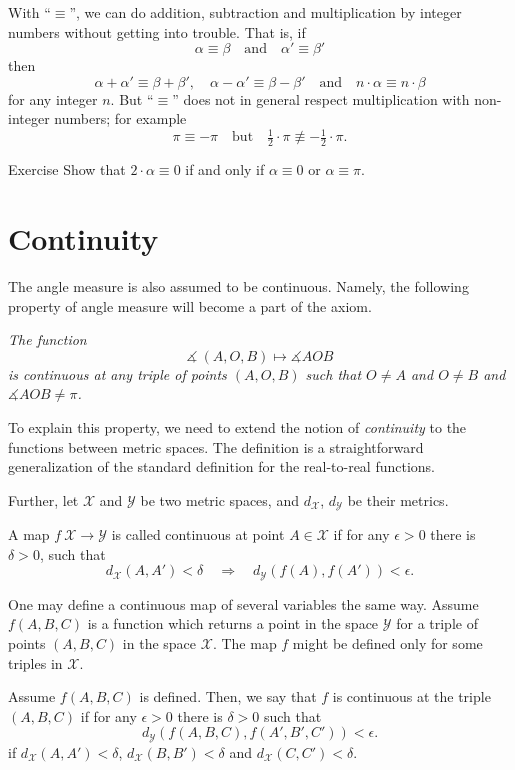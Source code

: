 With ``$\equiv$'', we can do addition, subtraction and multiplication by integer numbers without getting into trouble.
That is, if
$$\alpha\equiv\beta
\quad
\text{and}
\quad
\alpha'\equiv \beta'$$ 
then
$$\alpha+\alpha'\equiv\beta+\beta',
\quad
\alpha-\alpha'\equiv \beta-\beta'
\quad 
\text{and}
\quad
n\cdot\alpha\equiv n\cdot\beta$$
for any integer $n$.
But ``$\equiv$'' does not in general respect multiplication with non-integer numbers; for example 
$$\pi
\equiv 
-\pi
\quad
\text{but}
\quad
\tfrac12\cdot\pi
\not\equiv
-\tfrac12\cdot\pi.$$ 

\begin{thm}{Exercise}\label{ex:2a=0}
Show that $2\cdot\alpha\equiv0$ if and only if $\alpha\equiv0$ or $\alpha\equiv\pi$.
\end{thm}

\section*{Continuity}

The angle measure is also assumed to be continuous.
Namely, the following property of angle measure will become a part of the axiom.

\textit{The function}
$$\measuredangle\:(A,O,B)\mapsto\measuredangle A O B$$
\textit{is continuous at any triple of points $(A,O,B)$
such that $O\ne A$ and $O\ne B$ and $\measuredangle A O B\ne\pi$.}

To explain this property, we need to extend the notion of {}\emph{continuity} to the functions between metric spaces.
The definition is a straightforward generalization of the standard definition for the real-to-real functions.

Further, let $\mathcal X$ and $\mathcal Y$ be two metric spaces,
and $d_{\mathcal X}$, $d_{\mathcal Y}$ be their metrics.

A map $f\:\mathcal X\to\mathcal Y$ is called continuous at point $A\in \mathcal X$
if for any  $\epsilon>0$ there is $\delta>0$, such that 
\[d_{\mathcal X}(A,A')
<
\delta
\quad
\Rightarrow
\quad
d_{\mathcal Y}(f(A),f(A'))
<
\epsilon.\]

One may define a continuous map of several variables the same way.
Assume $f(A,B,C)$ is a function which returns a point in the space $\mathcal Y$ for a triple of points $(A,B,C)$
in the space $\mathcal X$.
The map $f$ might be defined only for some triples in $\mathcal X$.

Assume $f(A,B,C)$ is defined.
Then, we say that $f$ is continuous at the triple $(A,B,C)$ 
if for any $\epsilon>0$ there is $\delta>0$ such that 
\[d_{\mathcal Y}(f(A,B,C),f(A',B',C'))<\epsilon.\]
if $d_{\mathcal X}(A,A')<\delta$, $d_{\mathcal X}(B,B')<\delta$ and $d_{\mathcal X}(C,C')<\delta$.


